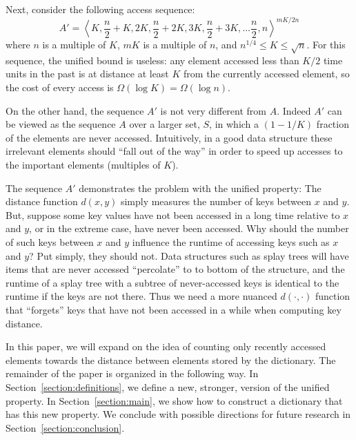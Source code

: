 \documentclass{llncs}
\newcommand{\BigOmega}[1]{\Omega\!\left(#1\right)}
\begin{document}
Next, consider the following access sequence:
\begin{equation}
	A' = \left\langle K, \frac{n}{2}+K, 2K, \frac{n}{2}+2K, 3K, \frac{n}{2}+3K, \ldots \frac{n}{2},n\right\rangle^{mK/2n}
\end{equation}
where $n$ is a multiple of $K$, $mK$ is a multiple of $n$, and $n^{1/4}\le K\le\sqrt{n}$. For this sequence, the unified bound is useless: any element accessed less than $K/2$ time units in the past is at distance at least $K$ from the currently accessed element, so the cost of every access is $\BigOmega{\log K} = \BigOmega{\log n}$.

On the other hand, the sequence $A'$ is not very different from $A$.  Indeed $A'$ can be viewed as the sequence $A$ over a larger set, $S$, in which a $(1-1/K)$ fraction of the elements are never accessed.  Intuitively, in a good data structure these irrelevant elements should ``fall out of the way'' in order to speed up accesses to the important elements (multiples of $K$).


The sequence $A'$ demonstrates the problem with the unified property: The distance function $d(x,y)$ simply measures the number of keys between $x$ and $y$. But, suppose some key values have not been accessed in a long time relative to $x$ and $y$, or in the extreme case, have never been accessed. Why should the number of such keys between $x$ and $y$ influence the runtime of accessing keys such as $x$ and $y$?
Put simply, they should not. Data structures such as splay trees will have items that are never accessed ``percolate'' to to bottom of the structure, and the runtime of a splay tree with a subtree of never-accessed keys is identical to the runtime if the keys are not there. Thus we need a more nuanced $d(\cdot,\cdot)$ function that ``forgets'' keys that have not been accessed in a while when computing key distance.

In this paper, we will expand on the idea of counting only recently accessed elements towards the distance between elements stored by the dictionary. The remainder of the paper is organized in the following way. In Section~\ref{section:definitions}, we define a new, stronger, version of the unified property. In Section~\ref{section:main}, we show how to construct a dictionary that has this new property. We conclude with possible directions for future research in Section~\ref{section:conclusion}.
\end{document}
